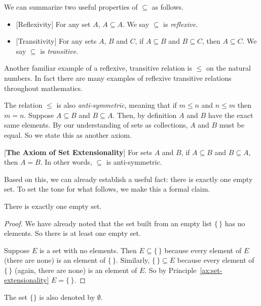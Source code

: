 We can summarize two useful properties of $\subseteq$ as follows.
\begin{itemize}
	\item{}[Reflexivity]  For any set $A$, $A \subseteq A$. We say $\subseteq$ is \emph{reflexive}.
	\item{}[Transitivity] For any sets $A$, $B$ and $C$,
	if $A\subseteq B$ and $B\subseteq C$, then $A\subseteq C$. We say $\subseteq$ is \emph{transitive}.
\end{itemize}
Another familiar example of a reflexive, transitive
relation is $\leq$ on the natural numbers. In fact there are many examples of reflexive transitive relations throughout mathematics. 

The relation $\leq$ is also \emph{anti-symmetric}, meaning that if $m\leq n$ and $n\leq m$ then $m=n$. 
Suppose $A\subseteq B$ and $B\subseteq A$. Then, by definition $A$ and $B$ have the exact same elements.  By our understanding of sets as collections,
$A$ and $B$ must be equal. So we state this as another axiom.

\begin{principle}\label{ax:set-extensionality}
[\textbf{The Axiom of Set Extensionality}]
For sets $A$ and $B$, if $A\subseteq B$ and $B\subseteq A$, then $A=B$. In other words, $\subseteq$ is anti-symmetric.
\end{principle}

Based on this, we can already establish a useful fact: there is exactly one empty set. To set the tone for what follows, we make this a formal claim.

\begin{lemma}
	There is exactly one empty set.
\begin{proof}
	We have already noted that the set built from an empty list $\{\,\}$ has no elements. So there is at least one empty set.
	
	Suppose $E$ is a set with no elements.
	Then $E\subseteq \{\,\}$ because every element of $E$ (there are none) is an element of $\{\,\}$. 
	Similarly, $\{\,\}\subseteq E$ because every element of $\{\,\}$ (again, there are none) is an element of $E$. 
	So by Principle~\ref{ax:set-extensionality} $E = \{\,\}$.
\end{proof}
\end{lemma}

\begin{defn}
  The set $\{\}$ is also denoted by $\emptyset$.
\end{defn}

